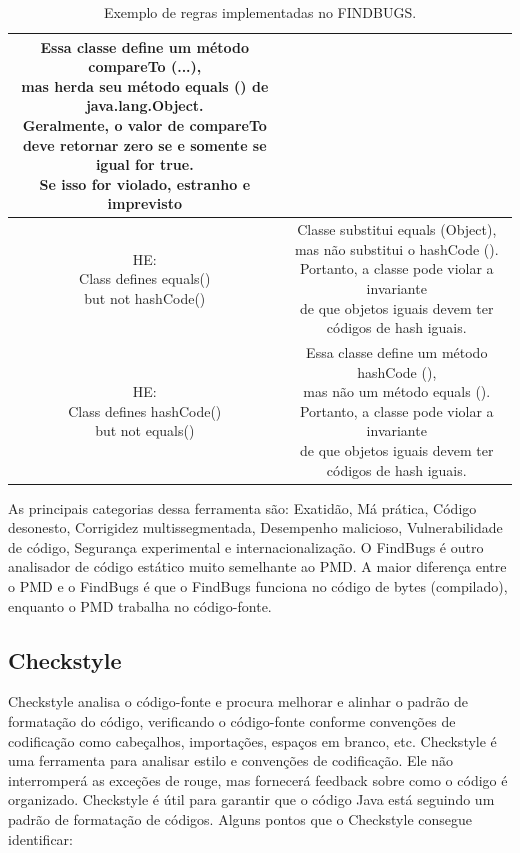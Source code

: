 \documentclass[12pt]{article}
\begin{document}
\begin{table}[h!]
\begin{tabular}{| c | c |}
  \makecell{Essa classe define um método compareTo (...),\\ mas herda seu método equals () de java.lang.Object.\\ Geralmente, o valor de compareTo\\ deve retornar zero se e somente se igual for true.\\ Se isso for violado, estranho e imprevisto} \\
  \hline \makecell{HE:\\ Class defines equals()\\ but not hashCode() } &
  \makecell{Classe substitui equals (Object),\\ mas não substitui o hashCode ().\\ Portanto, a classe pode violar a invariante\\ de que objetos iguais devem ter códigos de hash iguais.} \\
  \hline \makecell{HE:\\ Class defines hashCode()\\ but not equals() } &
  \makecell{Essa classe define um método hashCode (),\\ mas não um método equals ().\\ Portanto, a classe pode violar a invariante\\ de que objetos iguais devem ter\\ códigos de hash iguais.} \\
  [1ex]
  \hline
 \end{tabular}
 \caption{Exemplo de regras implementadas no FINDBUGS\cite{FINDBUGS}.}
 \label{table:FINDBUGS:rules}
\end{table}
 As principais categorias dessa ferramenta são: Exatidão, Má prática, Código desonesto, Corrigidez multissegmentada, Desempenho malicioso, Vulnerabilidade de código, Segurança experimental e internacionalização. O FindBugs é outro analisador de código estático muito semelhante ao PMD. A maior diferença entre o PMD e o FindBugs é que o FindBugs funciona no código de bytes (compilado), enquanto o PMD trabalha no código-fonte.


\subsection{Checkstyle} \label{sec:checkstyle}
Checkstyle analisa o código-fonte e procura melhorar e alinhar o padrão de formatação do código, verificando o código-fonte conforme convenções de codificação como cabeçalhos, importações, espaços em branco, etc.
		Checkstyle é uma ferramenta para analisar estilo e convenções de codificação. Ele não interromperá as exceções de rouge, mas fornecerá feedback sobre como o código é organizado. Checkstyle é útil para garantir que o código Java está seguindo um padrão de formatação de códigos.
		Alguns pontos que o Checkstyle consegue identificar:
\end{document}
